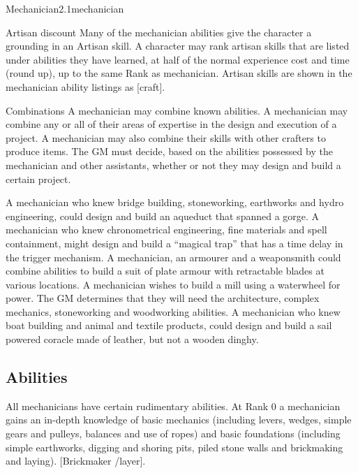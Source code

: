 \begin{skill}{Mechanician}{2.1}{mechanician}
\begin{Description}
\item[Artisan discount]
Many of the mechanician abilities give the character a grounding in an
Artisan skill. A character may rank artisan skills that are listed
under abilities they have learned, at half of the normal experience
cost and time (round up), up to the same Rank as mechanician. Artisan
skills are shown in the mechanician ability listings as [craft].

\item[Combinations]
A mechanician may combine known abilities.  A mechanician may combine
any or all of their areas of expertise in the design and execution of
a project. A mechanician may also combine their skills with other
crafters to produce items. The GM must decide, based on the abilities
possessed by the mechanician and other assistants, whether or not they
may design and build a certain project.

\end{Description}

\begin{example}
A mechanician who knew bridge building, stoneworking, earthworks and
hydro engineering, could design and build an aqueduct that spanned a
gorge. A mechanician who knew chronometrical engineering, fine
materials and spell containment, might design and build a ``magical
trap'' that has a time delay in the trigger mechanism.  A mechanician,
an armourer and a weaponsmith could combine abilities to build a suit
of plate armour with retractable blades at various locations.  A
mechanician wishes to build a mill using a waterwheel for power. The
GM determines that they will need the architecture, complex mechanics,
stoneworking and woodworking abilities. A mechanician who knew
boat building and animal and textile products, could design and build
a sail powered coracle made of leather, but not a wooden dinghy.
\end{example}

\subsection{Abilities}

All mechanicians have certain rudimentary abilities.  At Rank 0 a
mechanician gains an in-depth knowledge of basic mechanics (including
levers, wedges, simple gears and pulleys, balances and use of ropes)
and basic foundations (including simple earthworks, digging and
shoring pits, piled stone walls and brickmaking and
laying). [Brickmaker /layer].


\end{skill}
